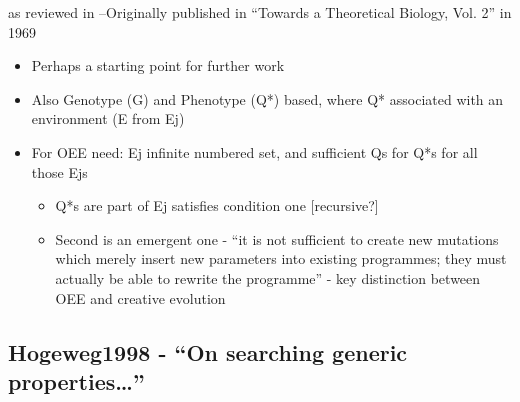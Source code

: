 \autocite{Waddington2008} as reviewed in \autocite{Taylor:1999sc}--Originally published in ``Towards a Theoretical Biology, Vol. 2'' in 1969

\begin{itemize}
	\item
	
	Perhaps a starting point for further work
	
	\item
	
	Also Genotype (G) and Phenotype (Q*) based, where Q* associated with
	an environment (E from Ej)
	
	\item
	
	For OEE need: Ej infinite numbered set, and sufficient Qs for Q*s
	for all those Ejs
	
	
	\begin{itemize}
		\item
		
		Q*s are part of Ej satisfies condition one {[}recursive?{]}
		
		\item
		
		Second is an emergent one - ``it is not sufficient to create new
		mutations which merely insert new parameters into existing
		programmes; they must actually be able to rewrite the programme''
		- key distinction between OEE and creative evolution
		
	\end{itemize}
\end{itemize}

		
		
		\hypertarget{hogeweg1998---on-searching-generic-properties}{\subsection{Hogeweg1998
				- ``On searching generic
				properties\ldots{}''}\label{hogeweg1998---on-searching-generic-properties}}
		
